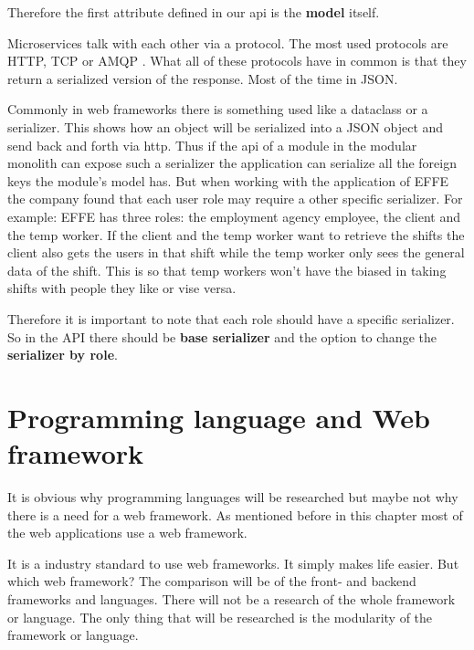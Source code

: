 Therefore the first attribute defined in our api is the \textbf{model} itself.

Microservices talk with each other via a protocol. The most used protocols are HTTP, TCP or AMQP \cite{microservicesAPI}. What all of these protocols have in common is that they return a serialized version of the response. Most of the time in JSON.

Commonly in web frameworks there is something used like a dataclass or a serializer. This shows how an object will be serialized into a JSON object and send back and forth via http. Thus if the api of a module in the modular monolith can expose such a serializer the application can serialize all the foreign keys the module's model has. But when working with the application of EFFE the company found that each user role may require a other specific serializer. For example: EFFE has three roles: the employment agency employee, the client and the temp worker. If the client and the temp worker want to retrieve the shifts the client also gets the users in that shift while the temp worker only sees the general data of the shift. This is so that temp workers won't have the biased in taking shifts with people they like or vise versa.

Therefore it is important to note that each role should have a specific serializer. So in the API there should be \textbf{base serializer} and the option to change the \textbf{serializer by role}.

\section{Programming language and Web framework}

It is obvious why programming languages will be researched but maybe not why there is a need for a web framework. As mentioned before in this chapter most of the web applications use a web framework.


It is a industry standard to use web frameworks. It simply makes life easier. But which web framework? The comparison will be of the front- and backend frameworks and languages. There will not be a research of the whole framework or language. The only thing that will be researched is the modularity of the framework or language.

